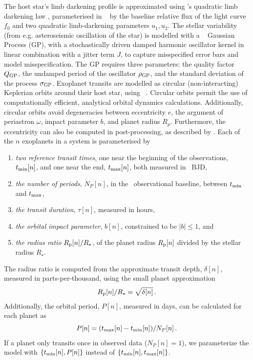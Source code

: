 \documentclass[floatfix,ApJL,twocolumn]{aastex631}
\begin{document}
The host star's limb darkening profile is approximated using \citet{Kipping:2013:MNRAS}'s quadratic limb darkening law \citep{Claret:2000:A&A, Mandel:2002:ApJL}, parameterised in \starry~\citep{Luger:2019:AJ} by the baseline relative flux of the light curve $f_0$ and two quadratic limb-darkening parameters $u_1, u_2$.
The stellar variability (from e.g. asteroseismic oscillation of the star) is modelled with a \celerite~\citep{Foreman-Mackey:2017:ascl} Gaussian Process (GP), with a stochastically driven damped harmonic oscillator kernel in linear combination with a jitter term $J$, to capture misspecified error bars and model misspecification.
The GP requires three parameters: the quality factor $Q_{\rm GP}$, the undamped period of the oscillator $\rho_{\rm GP}$, and the standard deviation of the process $\sigma_{\rm GP}$.
Exoplanet transits are modelled as circular (non-interacting) Keplerian orbits around their host star, using \exoplanet~\citep{Foreman-Mackey:2021:JOSS}.
Circular orbits permit the use of computationally efficient, analytical orbital dynamics calculations.
Additionally, circular orbits avoid degeneracies between eccentricity $e$, the argument of periastron $\omega$, impact parameter $b$, and planet radius $R_p$.
Furthermore, the eccentricity can also be computed in post-processing, as described by \citet{Dawson:2012:ApJ}.
Each of the $n$ exoplanets in a system is parameterised by
\begin{enumerate}
  \item \emph{two reference transit times}, one near the beginning of the observations, $\operatorname{\mathnormal{t_{\rm min}}}[n]$, and one near the end, $\operatorname{\mathnormal{t_{\rm max}}}[n]$, both measured in \tess\ BJD,
  \item \emph{the number of periods}, $N_P[n]$, in the \tess\ observational baseline, between $\operatorname{\mathnormal{t_{\rm min}}}$ and $\operatorname{\mathnormal{t_{\rm max}}}$,
  \item \emph{the transit duration}, $\tau[n]$, measured in hours,
  \item \emph{the orbital impact parameter}, $b[n]$, constrained to be $|b| \le 1$, and
    \item \emph{the radius ratio} $R_{\rm p}[n] / R_\star$, of the planet radius $R_{\rm p}[n]$ divided by the stellar radius $R_\star$.
\end{enumerate}
The radius ratio is computed from the approximate transit depth, $\delta[n]$, measured in parts-per-thousand, using the small planet approximation
\begin{equation}
    R_{\rm p}[n]/R_{\star} = \sqrt{\delta[n]}\, .
\end{equation}
Additionally, the orbital period, $P[n]$, measured in days, can be calculated for each planet as
\begin{equation}
  P[n] =  (\tmax[n] - \tmin[n]) / N_P[n]\, .
\end{equation}
If a planet only transits once in observed data ($N_P[n]=1$), we parameterize the model with $\{\operatorname{\mathnormal{t_{\rm min}}}[n], P[n]\}$ instead of $\{ \operatorname{\mathnormal{t_{\rm min}}}[n], \operatorname{\mathnormal{t_{\rm max}}}[n]\}$.
\end{document}
